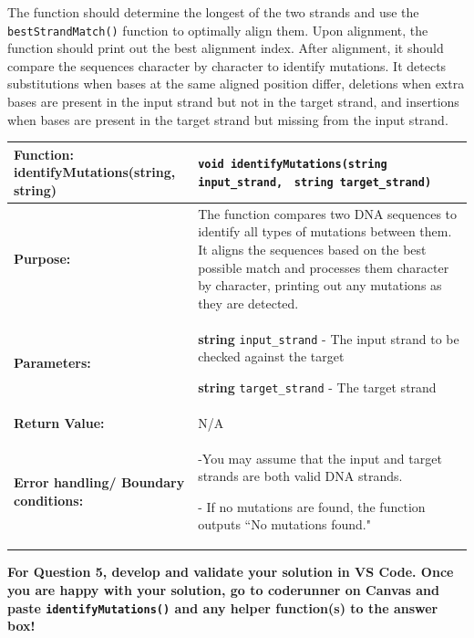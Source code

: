 The function should determine the longest of the two strands and use the \texttt{bestStrandMatch()} function to optimally align them. Upon alignment, the function should print out the best alignment index. After alignment, it should compare the sequences character by character to identify mutations. It detects substitutions when bases at the same aligned position differ, deletions when extra bases are present in the input strand but not in the target strand, and insertions when bases are present in the target strand but missing from the input strand.


\begin{longtable}{|p{1.7in}|p{4.0in}|}
    \hline
    \textbf{Function:} \newline identifyMutations(string, string)
        & 
        \texttt{void identifyMutations(string input_strand, }
        \texttt{string target_strand)} 
        \\ \hline
    
    \textbf{Purpose:} 
        & 
        The function compares two DNA sequences to identify all types of mutations between them. It aligns the sequences based on the best possible match and processes them character by character, printing out any mutations as they are detected.
        \\ \hline
    
    \textbf{Parameters:} 
        & 
        \textbf{string} \texttt{input\_strand} - The input strand to be checked against the target
        
        \textbf{string} \texttt{target\_strand} - The target strand
        \\ \hline
    
    \textbf{Return Value:} 
        & 
        N/A
        \\ \hline
    \textbf{Error handling/ Boundary conditions:} 
        &
        -You may assume that the input and target strands are both valid DNA strands.
        
        - If no mutations are found, the function outputs ``No mutations found."

       
    \\ \hline
\end{longtable}

\textbf{For Question 5, develop and validate your solution in VS Code. Once you are happy with your solution, go to coderunner on Canvas and paste \texttt{identifyMutations()} and any helper function(s) to the answer box!} 

